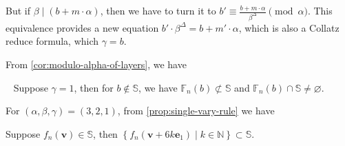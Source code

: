 But if $\beta \mid (b + m\cdot\alpha)$, then we have to turn it to $b' \equiv \frac{b + m\cdot\alpha}{\beta^{\Delta}}\pmod{\alpha}$.
This equivalence provides a new equation $b'\cdot \beta^{\Delta} = b + m'\cdot\alpha$, which is also a Collatz reduce formula, which $\gamma = b$.

From \cref{cor:modulo-alpha-of-layers}, we have
\begin{proposition}~\label{prop:all-source-value-set-has-primitive-source}
    Suppose $\gamma = 1$, then for $b \not\in\mathbb{S}$, we have $\mathbb{F}_{n}(b) \not\subset \mathbb{S}$ and $\mathbb{F}_{n}(b) \cap \mathbb{S} \ne \varnothing$.
\end{proposition}

For $(\alpha, \beta, \gamma) = (3,2,1)$, from \cref{prop:single-vary-rule} we have
\begin{proposition}
    Suppose $f_{n}(\bm{v}) \in \mathbb{S}$, then $\left\{f_{n}(\bm{v} + 6k\bm{e}_1) \mid k\in\mathbb{N}\right\} \subset \mathbb{S}$.
\end{proposition}